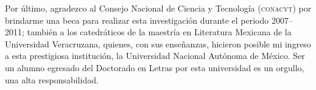 \documentclass[14pt,twoside,final]{extbook} %
\begin{document}
Por último, agradezco al Consejo Nacional de Ciencia y Tecnología (\textsc{conacyt}) por brindarme una beca para realizar esta investigación durante el periodo 2007--2011; también a los catedráticos de la maestría en Literatura Mexicana de la Universidad Veracruzana, quienes, con sus enseñanzas, hicieron posible mi ingreso a esta prestigiosa institución, la Universidad Nacional Autónoma de México. Ser un alumno egresado del Doctorado en Letras por esta universidad es un orgullo, una alta responsabilidad.
\clearpage
\makeatletter
\renewcommand\@dotsep{200} %
\makeatother
\renewcommand{\contentsname}{Índice}
\thispagestyle{empty}
\pagestyle{fancy}
\fancyhf{} %
\fancyhead[RO,LE]{\thepage}
\fancyfoot{}
\renewcommand{\headrulewidth}{0pt}
\protect{}
{}
\tableofcontents
{}
\newpage
\pagestyle{empty}
\null\vfill
\newpage
\pagestyle{empty}
\hspace*{0pt}
\vfill
\end{document}

